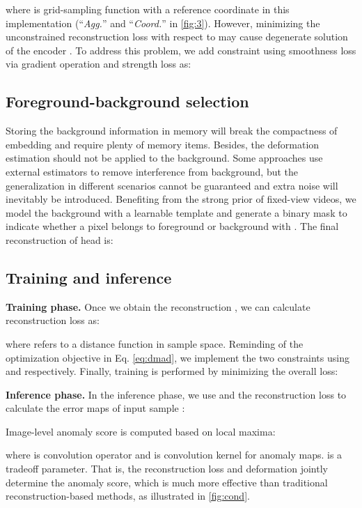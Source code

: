 \documentclass[10pt,twocolumn,letterpaper]{article}
\begin{document}
        where  is grid-sampling function with a reference coordinate in this implementation (``\textit{Agg.}'' and ``\textit{Coord.}'' in \cref{fig:3}). However, minimizing the unconstrained reconstruction loss with respect to  may cause degenerate solution of the encoder . To address this problem, we add constraint using smoothness loss via gradient operation and strength loss as:
        
        
    \subsection{Foreground-background selection}
        Storing the background information in memory will break the compactness of embedding and require plenty of memory items. Besides, the deformation estimation should not be applied to the background. Some approaches use external estimators to remove interference from background, but the generalization in different scenarios cannot be guaranteed and extra noise will inevitably be introduced. Benefiting from the strong prior of fixed-view videos, we model the background with a learnable template  and generate a binary mask to indicate whether a pixel belongs to foreground or background with . The final reconstruction  of  head is:
        

    \subsection{Training and inference}
        \textbf{Training phase.}
        Once we obtain the reconstruction , we can calculate reconstruction loss  as:
        
        where  refers to a distance function in sample space. Reminding of the optimization objective in Eq. \ref{eq:dmad}, we implement the two constraints using  and  respectively. Finally, training is performed by minimizing the overall loss:
        

        \textbf{Inference phase.}
        In the inference phase, we use  and the reconstruction loss to calculate the error maps of input sample :
        
        
        Image-level anomaly score is computed based on local maxima:
        
        where  is convolution operator and  is convolution kernel for anomaly maps.  is a tradeoff parameter. That is, the reconstruction loss and deformation jointly determine the anomaly score, which is much more effective than traditional reconstruction-based methods, as illustrated in \cref{fig:cond}.
            
\end{document}

